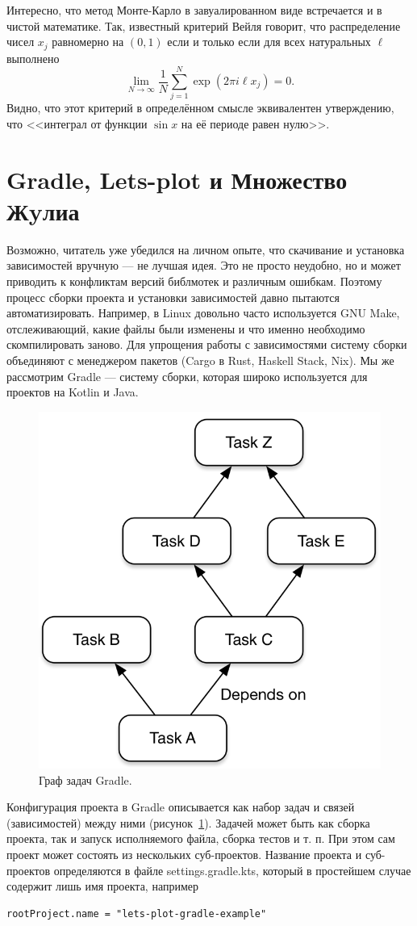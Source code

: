 \documentclass{book}
\begin{document}
Интересно, что метод Монте-Карло в завуалированном виде встречается и в чистой математике. Так,
известный критерий Вейля говорит, что распределение чисел $x_j$ равномерно на $(0, 1)$ если и
только если для всех натуральных $\ell$ выполнено
\begin{equation}
    \lim_{N \to \infty} \frac{1}{N} \sum_{j = 1}^N \exp(2 \pi i \ell x_j) = 0.
\end{equation}
Видно, что этот критерий в определённом смысле эквивалентен утверждению, что <<интеграл от функции
$\sin x$ на её периоде равен нулю>>.

\clearpage

\section{Gradle, Lets-plot и Множество Жyлиа}

Возможно, читатель уже убедился на личном опыте, что скачивание и установка зависимостей вручную
--- не лучшая идея. Это не просто неудобно, но и может приводить к конфликтам версий библмотек и
различным ошибкам. Поэтому процесс сборки проекта и установки зависимостей давно пытаются
автоматизировать. Например, в Linux довольно часто используется GNU Make, отслеживающий, какие
файлы были изменены и что именно необходимо скомпилировать заново. Для упрощения работы с
зависимостями систему сборки объединяют с менеджером пакетов (Cargo в Rust, Haskell Stack, Nix). Мы
же рассмотрим Gradle --- систему сборки, которая широко используется для проектов на Kotlin и Java.

\begin{figure}
    \includegraphics[width = 0.5\linewidth]{gradle_graph.png}
    \caption{\label{gradle_graph}Граф задач Gradle.}
\end{figure}

Конфигурация проекта в Gradle описывается как набор задач и связей (зависимостей) между ними
(рисунок~\ref{gradle_graph}). Задачей может быть как сборка проекта, так и запуск исполняемого
файла, сборка тестов и т. п. При этом сам проект может состоять из нескольких суб-проектов.
Название проекта и суб-проектов определяются в файле settings.gradle.kts, который в простейшем
случае содержит лишь имя проекта, например
\begin{verbatim}
rootProject.name = "lets-plot-gradle-example"
\end{verbatim}
\end{document}
